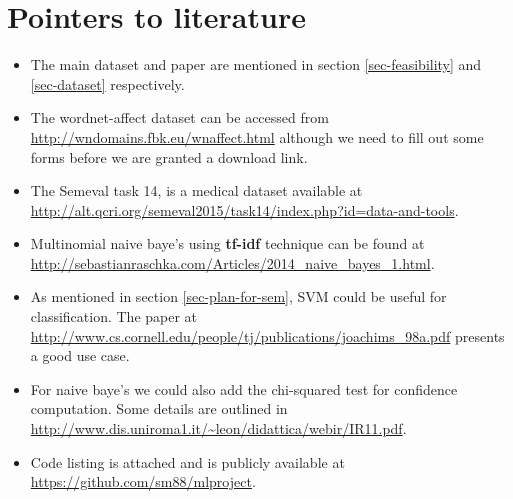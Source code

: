 \section{Pointers to literature}
\begin{itemize}
 \item The main dataset and paper are mentioned in section \ref{sec-feasibility} and \ref{sec-dataset} respectively.
 \item The wordnet-affect dataset can be accessed from \url{http://wndomains.fbk.eu/wnaffect.html} although we need to fill out some forms before we are granted a download link.
 \item The Semeval task 14, is a medical dataset available at \url{http://alt.qcri.org/semeval2015/task14/index.php?id=data-and-tools}.
 \item Multinomial naive baye's using \textbf{tf-idf} technique can be found at \url{http://sebastianraschka.com/Articles/2014_naive_bayes_1.html}.
 \item As mentioned in section \ref{sec-plan-for-sem}, SVM could be useful for classification. The paper at \url{http://www.cs.cornell.edu/people/tj/publications/joachims_98a.pdf} presents a good use case.
 \item For naive baye's we could also add the chi-squared test for confidence computation. Some details are outlined in \url{http://www.dis.uniroma1.it/~leon/didattica/webir/IR11.pdf}.
 \item Code listing is attached and is publicly available at \url{https://github.com/sm88/mlproject}.
\end{itemize}




